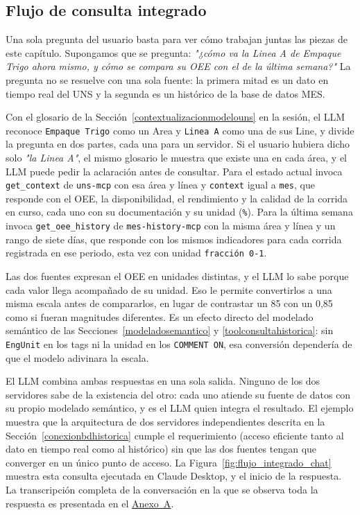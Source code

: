 \subsection{Flujo de consulta integrado}
\label{flujoconsultaintegrado}

Una sola pregunta del usuario basta para ver cómo trabajan juntas las piezas de este capítulo. Supongamos que se pregunta: \emph{"¿cómo va la Linea A de Empaque Trigo ahora mismo, y cómo se compara su OEE
con el de la última semana?"} La pregunta no se resuelve con una sola fuente: la primera mitad
es un dato en tiempo real del UNS y la segunda es un histórico de la base de datos MES.

Con el glosario de la Sección~\ref{contextualizacionmodelouns} en la sesión, el LLM reconoce
\texttt{Empaque Trigo} como un Area y \texttt{Linea A} como una de sus Line, y divide la
pregunta en dos partes, cada una para un servidor. Si el usuario hubiera dicho solo
\emph{"la Linea A"}, el mismo glosario le muestra que existe una en cada área, y el LLM puede
pedir la aclaración antes de consultar. Para el estado actual invoca \texttt{get\_context} de
\texttt{uns-mcp} con esa área y línea y \texttt{context} igual a \texttt{mes}, que responde con
el OEE, la disponibilidad, el rendimiento y la calidad de la corrida en curso, cada uno con su
documentación y su unidad (\texttt{\%}). Para la última semana invoca \texttt{get\_oee\_history}
de \texttt{mes-history-mcp} con la misma área y línea y un rango de siete días, que responde con
los mismos indicadores para cada corrida registrada en ese periodo, esta vez con unidad
\texttt{fracción 0-1}.

Las dos fuentes expresan el OEE en unidades distintas, y el LLM lo sabe porque cada valor llega
acompañado de su unidad. Eso le permite convertirlos a una misma escala antes de compararlos,
en lugar de contrastar un 85 con un 0,85 como si fueran magnitudes diferentes. Es un efecto
directo del modelado semántico de las Secciones~\ref{modeladosemantico} y
\ref{toolconsultahistorica}: sin \texttt{EngUnit} en los tags ni la unidad en los
\texttt{COMMENT ON}, esa conversión dependería de que el modelo adivinara la escala.

El LLM combina ambas respuestas en una sola salida. Ninguno de los dos servidores sabe
de la existencia del otro: cada uno atiende su fuente de datos con su propio modelado
semántico, y es el LLM quien integra el resultado. El ejemplo muestra que la arquitectura de
dos servidores independientes descrita en la Sección~\ref{conexionbdhistorica} cumple el
requerimiento  (acceso eficiente tanto al dato en tiempo real como al histórico) sin que
las dos fuentes tengan que converger en un único punto de acceso. La
Figura~\ref{fig:flujo_integrado_chat} muestra esta consulta ejecutada en Claude Desktop, y el inicio de la respuesta. La transcripción completa de la conversación en la que se observa toda la respuesta es presentada en el \hyperref[anexo:conversacion_flujo]{Anexo~A}. 

